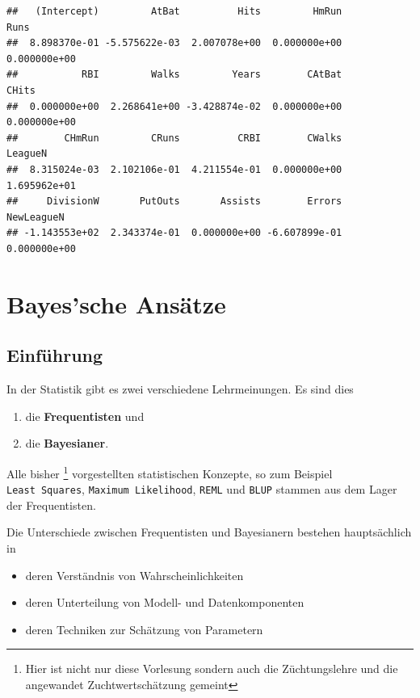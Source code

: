 \documentclass[]{book}
\providecommand{\tightlist}{%
  \setlength{\itemsep}{0pt}\setlength{\parskip}{0pt}}
\let\rmarkdownfootnote\footnote%
\def\footnote{\protect\rmarkdownfootnote}
\begin{document}
\begin{verbatim}
##   (Intercept)         AtBat          Hits         HmRun          Runs 
##  8.898370e-01 -5.575622e-03  2.007078e+00  0.000000e+00  0.000000e+00 
##           RBI         Walks         Years        CAtBat         CHits 
##  0.000000e+00  2.268641e+00 -3.428874e-02  0.000000e+00  0.000000e+00 
##        CHmRun         CRuns          CRBI        CWalks       LeagueN 
##  8.315024e-03  2.102106e-01  4.211554e-01  0.000000e+00  1.695962e+01 
##     DivisionW       PutOuts       Assists        Errors    NewLeagueN 
## -1.143553e+02  2.343374e-01  0.000000e+00 -6.607899e-01  0.000000e+00
\end{verbatim}

\chapter{Bayes'sche Ansätze}\label{bayessche-ansatze}

\section{Einführung}\label{einfuhrung}

In der Statistik gibt es zwei verschiedene Lehrmeinungen. Es sind dies

\begin{enumerate}
\def\labelenumi{\arabic{enumi}.}
\tightlist
\item
  die \textbf{Frequentisten} und
\item
  die \textbf{Bayesianer}.
\end{enumerate}

Alle bisher
\footnote{Hier ist nicht nur diese Vorlesung sondern auch die Züchtungslehre und die angewandet Zuchtwertschätzung gemeint}
vorgestellten statistischen Konzepte, so zum Beispiel
\texttt{Least\ Squares}, \texttt{Maximum\ Likelihood}, \texttt{REML} und
\texttt{BLUP} stammen aus dem Lager der Frequentisten.

Die Unterschiede zwischen Frequentisten und Bayesianern bestehen
hauptsächlich in

\begin{itemize}
\tightlist
\item
  deren Verständnis von Wahrscheinlichkeiten
\item
  deren Unterteilung von Modell- und Datenkomponenten
\item
  deren Techniken zur Schätzung von Parametern
\end{itemize}
\end{document}

